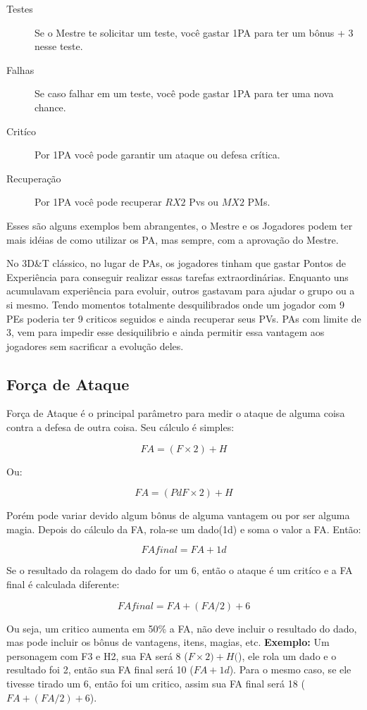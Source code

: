 \begin{description}
\item[Testes] Se o Mestre te solicitar um teste, você gastar 1PA para ter um bônus + 3 nesse teste. 
\item[Falhas] Se caso falhar em um teste, você pode gastar 1PA para ter uma nova chance.
\item[Critíco] Por 1PA você pode garantir um ataque ou defesa crítica.
\item[Recuperação] Por 1PA você pode recuperar \(RX2\) Pvs ou \(MX2\) PMs.
\end{description}

Esses são alguns exemplos bem abrangentes, o Mestre e os Jogadores podem ter mais idéias de como utilizar os PA, mas sempre, com a aprovação do Mestre.

\begin{framed}
No 3D\&T clássico, no lugar de PAs, os jogadores tinham que gastar Pontos de Experiência para conseguir realizar essas tarefas extraordinárias. Enquanto uns acumulavam experiência para evoluir, outros gastavam para ajudar o grupo ou a si mesmo. Tendo momentos totalmente desquilibrados onde um jogador com 9 PEs poderia ter 9 criticos seguidos e ainda recuperar seus PVs. PAs com limite de 3, vem para impedir esse desiquilibrio e ainda permitir essa vantagem aos jogadores sem sacrificar a evolução deles. 
\end{framed}

\subsection{Força de Ataque}

Força de Ataque é o principal parâmetro para medir o ataque de alguma coisa contra a defesa de outra coisa. Seu cálculo é simples:

\[ FA = (F \times 2) + H \]

Ou:

\[ FA = (PdF \times 2) + H \]

Porém pode variar devido algum bônus de alguma vantagem ou por ser alguma magia. Depois do cálculo da FA, rola-se um dado(1d) e soma o valor a FA. Então:

\[ FAfinal = FA + 1d \]

Se o resultado da rolagem do dado for um 6, então o ataque é um critíco e a FA final é calculada diferente:

\[ FAfinal =  FA + (FA/2) + 6 \]

Ou seja, um critico aumenta em 50\% a FA, não deve incluir o  resultado do dado, mas pode incluir os bônus de vantagens, itens, magias, etc. {\bf Exemplo: } Um personagem com F3 e H2, sua FA será 8 (\(F \times 2) + H(\)), ele rola um dado e o resultado foi 2, então sua FA final será 10 (\( FA + 1d \)). Para o mesmo caso, se ele tivesse tirado um 6, então foi um critico, assim sua FA final será 18 (\(FA + (FA/2) + 6\)).

